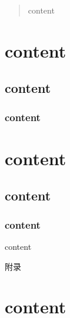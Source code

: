 \documentclass{MathorCupmodeling}
\begin{document}
	\begin{abstract}
		content
	\end{abstract}
	\tableofcontents\newpage
	\section{content}
	\subsection{content}
	\subsubsection{content}
	\section{content}
	\subsection{content}
	\subsubsection{content}

	\begin{thebibliography}{99}
	content
	\end{thebibliography}

	\newpage
	\appendix
	\begin{center}
		\heiti{} 附\hspace{1pc}录
	\end{center}
	\section{content}
\end{document}
